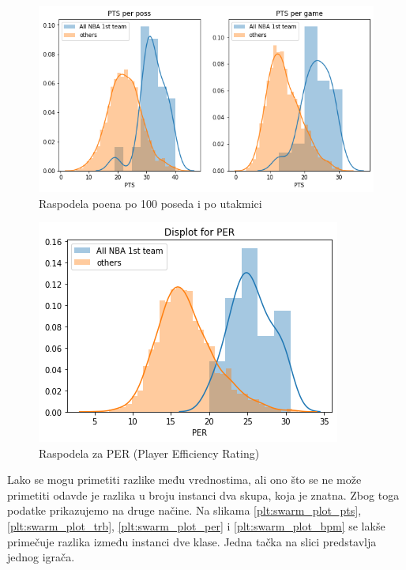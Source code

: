 \documentclass[a4paper]{article}
\begin{document}
\begin{figure}[h!]
\begin{center}
\includegraphics[scale=0.50]{dist_plot_points.png}
\end{center}
\caption{Raspodela poena po 100 poseda i po utakmici}
\label{plt:dist_plot_pts}
\end{figure}

\begin{figure}[h!]
\begin{center}
\includegraphics[scale=0.50]{dist_plot_per.png}
\end{center}
\caption{Raspodela za PER (Player Efficiency Rating)}
\label{plt:dist_plot_per}
\end{figure}

Lako se mogu primetiti razlike među vrednostima, ali ono što se ne može
primetiti odavde je razlika u broju instanci dva skupa, koja je znatna. Zbog toga
podatke prikazujemo na druge načine. Na slikama \ref{plt:swarm_plot_pts}, \ref{plt:swarm_plot_trb}, \ref{plt:swarm_plot_per} i \ref{plt:swarm_plot_bpm} se lakše primečuje razlika između instanci dve klase. Jedna tačka na slici predstavlja jednog igrača.
\end{document}
